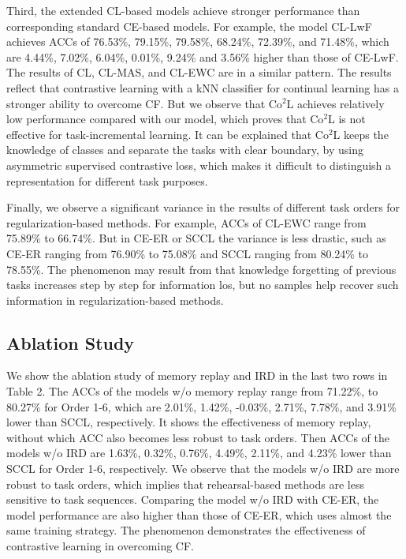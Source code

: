 Third,  the  extended CL-based models achieve stronger performance than corresponding standard CE-based models. For example,  the model CL-LwF achieves 
ACCs of 76.53\%, 79.15\%, 79.58\%, 68.24\%, 72.39\%, and 71.48\%, which are 4.44\%, 7.02\%, 6.04\%, 0.01\%, 9.24\% and 3.56\% higher than those of CE-LwF. The results of CL, CL-MAS, and CL-EWC are in a similar pattern.  The results reflect that contrastive learning with a kNN classifier for continual learning has a stronger ability to overcome CF. But we observe that Co$^2$L achieves relatively low performance compared with our model, which proves that Co$^2$L is not effective for task-incremental learning. It can be explained that Co$^2$L keeps the knowledge of classes and separate the tasks with clear boundary, by using asymmetric supervised contrastive loss, which makes it difficult to distinguish a representation for different task purposes.


Finally, we observe a significant variance in the results of different task orders for regularization-based methods. For example, ACCs of CL-EWC range from 75.89\% to 66.74\%.  But in CE-ER or SCCL the variance is less drastic, such as CE-ER ranging from 76.90\% to 75.08\% and SCCL ranging from 80.24\% to 78.55\%. The phenomenon may result from that knowledge forgetting of previous tasks increases step by step for information los, but no samples help recover such information in regularization-based methods.


\subsection{Ablation Study}
We show the ablation study of memory replay and IRD in the last two rows in Table 2. The ACCs of the models w/o memory replay range from 71.22\%, to 80.27\% for Order 1-6,  which are 2.01\%, 1.42\%, -0.03\%, 2.71\%, 7.78\%, and 3.91\% lower than SCCL, respectively.  It shows the effectiveness of memory replay, without which ACC also becomes less robust to task orders. Then ACCs of the models w/o IRD are 1.63\%, 0.32\%, 0.76\%, 4.49\%, 2.11\%, and 4.23\% lower than SCCL for Order 1-6, respectively. We observe that the models w/o IRD are more robust to task orders, which implies that rehearsal-based methods  are less sensitive to task sequences. Comparing the model w/o IRD with CE-ER, the model performance are also higher than those of CE-ER, which uses almost the same training strategy. The phenomenon demonstrates the effectiveness of contrastive learning in overcoming CF.

